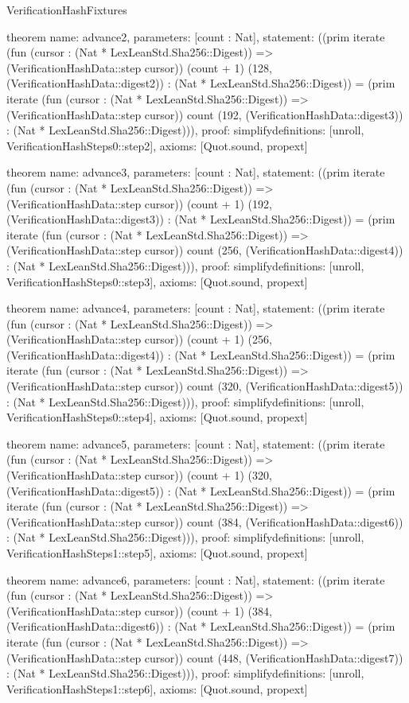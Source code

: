 \begin{lexlean}{VerificationHashFixtures}
\begin{semanticmodule}
theorem{
  name: advance2,
  parameters: [count : Nat],
  statement: ((prim iterate (fun (cursor : (Nat * LexLeanStd.Sha256::Digest)) => (VerificationHashData::step cursor)) (count + 1) (128, (VerificationHashData::digest2)) : (Nat * LexLeanStd.Sha256::Digest)) = (prim iterate (fun (cursor : (Nat * LexLeanStd.Sha256::Digest)) => (VerificationHashData::step cursor)) count (192, (VerificationHashData::digest3)) : (Nat * LexLeanStd.Sha256::Digest))),
  proof: simplify{definitions: [unroll, VerificationHashSteps0::step2]},
  axioms: [Quot.sound, propext]
}

theorem{
  name: advance3,
  parameters: [count : Nat],
  statement: ((prim iterate (fun (cursor : (Nat * LexLeanStd.Sha256::Digest)) => (VerificationHashData::step cursor)) (count + 1) (192, (VerificationHashData::digest3)) : (Nat * LexLeanStd.Sha256::Digest)) = (prim iterate (fun (cursor : (Nat * LexLeanStd.Sha256::Digest)) => (VerificationHashData::step cursor)) count (256, (VerificationHashData::digest4)) : (Nat * LexLeanStd.Sha256::Digest))),
  proof: simplify{definitions: [unroll, VerificationHashSteps0::step3]},
  axioms: [Quot.sound, propext]
}

theorem{
  name: advance4,
  parameters: [count : Nat],
  statement: ((prim iterate (fun (cursor : (Nat * LexLeanStd.Sha256::Digest)) => (VerificationHashData::step cursor)) (count + 1) (256, (VerificationHashData::digest4)) : (Nat * LexLeanStd.Sha256::Digest)) = (prim iterate (fun (cursor : (Nat * LexLeanStd.Sha256::Digest)) => (VerificationHashData::step cursor)) count (320, (VerificationHashData::digest5)) : (Nat * LexLeanStd.Sha256::Digest))),
  proof: simplify{definitions: [unroll, VerificationHashSteps0::step4]},
  axioms: [Quot.sound, propext]
}

theorem{
  name: advance5,
  parameters: [count : Nat],
  statement: ((prim iterate (fun (cursor : (Nat * LexLeanStd.Sha256::Digest)) => (VerificationHashData::step cursor)) (count + 1) (320, (VerificationHashData::digest5)) : (Nat * LexLeanStd.Sha256::Digest)) = (prim iterate (fun (cursor : (Nat * LexLeanStd.Sha256::Digest)) => (VerificationHashData::step cursor)) count (384, (VerificationHashData::digest6)) : (Nat * LexLeanStd.Sha256::Digest))),
  proof: simplify{definitions: [unroll, VerificationHashSteps1::step5]},
  axioms: [Quot.sound, propext]
}

theorem{
  name: advance6,
  parameters: [count : Nat],
  statement: ((prim iterate (fun (cursor : (Nat * LexLeanStd.Sha256::Digest)) => (VerificationHashData::step cursor)) (count + 1) (384, (VerificationHashData::digest6)) : (Nat * LexLeanStd.Sha256::Digest)) = (prim iterate (fun (cursor : (Nat * LexLeanStd.Sha256::Digest)) => (VerificationHashData::step cursor)) count (448, (VerificationHashData::digest7)) : (Nat * LexLeanStd.Sha256::Digest))),
  proof: simplify{definitions: [unroll, VerificationHashSteps1::step6]},
  axioms: [Quot.sound, propext]
}


\end{semanticmodule}
\end{lexlean}
